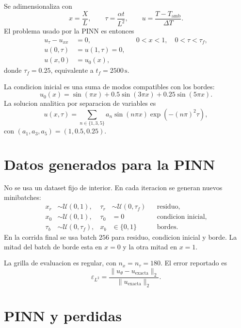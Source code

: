 \documentclass[11pt,a4paper]{article}
\begin{document}
Se adimensionaliza con
\begin{equation}
  x=\frac{X}{L},\qquad
  \tau=\frac{\alpha t}{L^2},\qquad
  u=\frac{T-T_{\mathrm{amb}}}{\Delta T}.
\end{equation}
El problema usado por la PINN es entonces
\begin{align}
  u_\tau-u_{xx} &= 0,
  &&0<x<1,\quad 0<\tau<\tau_f,\\
  u(0,\tau)&=u(1,\tau)=0,\\
  u(x,0)&=u_0(x),
\end{align}
donde $\tau_f=0.25$, equivalente a $t_f=2500\,\mathrm{s}$.

La condicion inicial es una suma de modos compatibles con los bordes:
\begin{equation}
  u_0(x)=\sin(\pi x)+0.5\sin(3\pi x)+0.25\sin(5\pi x).
\end{equation}
La solucion analitica por separacion de variables es
\begin{equation}
  u(x,\tau)=\sum_{n\in\{1,3,5\}} a_n
  \sin(n\pi x)\exp\left(-(n\pi)^2\tau\right),
\end{equation}
con $(a_1,a_3,a_5)=(1,0.5,0.25)$.

\section{Datos generados para la PINN}

No se usa un dataset fijo de interior. En cada iteracion se generan nuevos
minibatches:
\begin{align}
  x_r &\sim \mathcal{U}(0,1),&
  \tau_r &\sim \mathcal{U}(0,\tau_f) && \text{residuo},\\
  x_0 &\sim \mathcal{U}(0,1),&
  \tau_0 &= 0 && \text{condicion inicial},\\
  \tau_b &\sim \mathcal{U}(0,\tau_f),&
  x_b &\in \{0,1\} && \text{bordes}.
\end{align}
En la corrida final se usa batch $256$ para residuo, condicion inicial y borde.
La mitad del batch de borde esta en $x=0$ y la otra mitad en $x=1$.

La grilla de evaluacion es regular, con $n_x=n_\tau=180$. El error reportado es
\begin{equation}
  \varepsilon_{L^2}=
  \frac{\lVert u_\theta-u_{\mathrm{exacta}}\rVert_2}
       {\lVert u_{\mathrm{exacta}}\rVert_2}.
\end{equation}

\section{PINN y perdidas}
\end{document}
